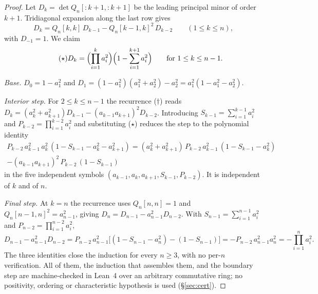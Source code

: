 \documentclass[11pt,a4paper]{article}
\theoremstyle{definition}
\theoremstyle{remark}
\theoremstyle{plain}
\begin{document}
\begin{proof}
Let $D_k=\det Q_n[:k{+}1,:k{+}1]$ be the leading principal minor of order $k+1$. Tridiagonal
expansion along the last row gives
\begin{equation*}\tag{$\dagger$}
D_k=Q_n[k,k]\,D_{k-1}-Q_n[k-1,k]^2\,D_{k-2}\qquad(1\le k\le n),
\end{equation*}
with $D_{-1}=1$. We claim
\begin{equation*}\tag{$\star$}
D_k=\Bigl(\prod_{i=1}^ka_i^2\Bigr)\Bigl(1-\sum_{i=1}^{k+1}a_i^2\Bigr)
\qquad\text{for }1\le k\le n-1 .
\end{equation*}

\emph{Base.} $D_0=1-a_1^2$ and $D_1=(1-a_1^2)(a_1^2+a_2^2)-a_2^2=a_1^2(1-a_1^2-a_2^2)$.

\emph{Interior step.} For $2\le k\le n-1$ the recurrence ($\dagger$) reads
$D_k=(a_k^2+a_{k+1}^2)D_{k-1}-(a_{k-1}a_{k+1})^2D_{k-2}$. Introducing
$S_{k-1}=\sum_{i=1}^{k-1}a_i^2$ and $P_{k-2}=\prod_{i=1}^{k-2}a_i^2$ and substituting ($\star$)
reduces the step to the polynomial identity
\begin{multline*}
P_{k-2}\,a_{k-1}^2\,a_k^2\,(1-S_{k-1}-a_k^2-a_{k+1}^2)
=(a_k^2+a_{k+1}^2)\,P_{k-2}\,a_{k-1}^2\,(1-S_{k-1}-a_k^2)\\
-(a_{k-1}a_{k+1})^2\,P_{k-2}\,(1-S_{k-1})
\end{multline*}
in the five independent symbols $(a_{k-1},a_k,a_{k+1},S_{k-1},P_{k-2})$. It is independent of
$k$ and of $n$.

\emph{Final step.} At $k=n$ the recurrence uses $Q_n[n,n]=1$ and $Q_n[n-1,n]^2=a_{n-1}^2$,
giving $D_n=D_{n-1}-a_{n-1}^2D_{n-2}$. With $S_{n-1}=\sum_{i=1}^{n-1}a_i^2$ and
$P_{n-2}=\prod_{i=1}^{n-2}a_i^2$,
\[
D_{n-1}-a_{n-1}^2D_{n-2}
=P_{n-2}\,a_{n-1}^2\bigl[(1-S_{n-1}-a_n^2)-(1-S_{n-1})\bigr]
=-P_{n-2}\,a_{n-1}^2a_n^2=-\prod_{i=1}^na_i^2 .
\]
The three identities close the induction for every $n\ge3$, with no per-$n$ verification. All of
them, the induction that assembles them, and the boundary step are machine-checked in Lean~4
over an arbitrary commutative ring; no positivity, ordering or characteristic hypothesis is used
(\S\ref{sec:cert}).
\end{proof}
\end{document}
